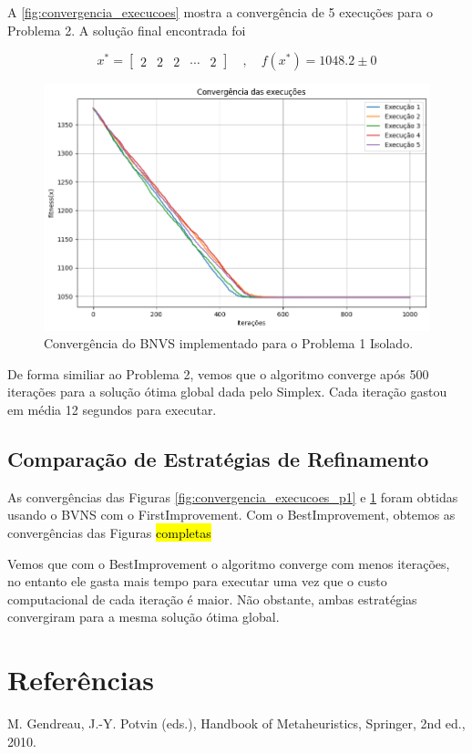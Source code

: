 \documentclass[
	12pt,				%
	oneside,			%
	a4paper,			%
	chapter=TITLE,
	sumario=tradicional,
	english,			%
	brazil				%
]{abntex2}
\begin{document}
A \autoref{fig:convergencia_execucoes} mostra a convergência de 5 execuções
para o Problema 2. A solução final encontrada foi 

\[  x^* = \begin{bmatrix} 2 & 2 & 2 & \cdots & 2 \end{bmatrix} \quad , \quad f\left(x^*\right) = 1048.2 \pm 0 \]

\begin{figure}[h!]
	\caption{\label{fig:convergencia_execucoes}Convergência do BNVS implementado para o Problema 1 Isolado.}
	\begin{center}
    \includegraphics[width=\textwidth,trim=1 1 1 1,clip]{convergencia_execucoes.png}
	\end{center}
\end{figure}

De forma similiar ao Problema 2, vemos que o algoritmo converge após 500 iterações para a solução 
ótima global dada pelo Simplex. Cada iteração gastou em média 12 segundos para executar.

\section{Comparação de Estratégias de Refinamento}

As convergências das Figuras \ref{fig:convergencia_execucoes_p1} e \ref{fig:convergencia_execucoes}
foram obtidas usando o BVNS com o FirstImprovement. Com o BestImprovement, obtemos 
as convergências das Figuras \hl{completas}




Vemos que com o BestImprovement o algoritmo converge com menos iterações, no entanto 
ele gasta mais tempo para executar uma vez que o custo computacional de cada iteração é maior.
Não obstante, ambas estratégias convergiram para a mesma solução ótima global.


\chapter{Referências}\label{cap:referencias} 

\noindent M. Gendreau, J.-Y. Potvin (eds.), Handbook of Metaheuristics, Springer, 2nd ed., 2010.
\end{document}
